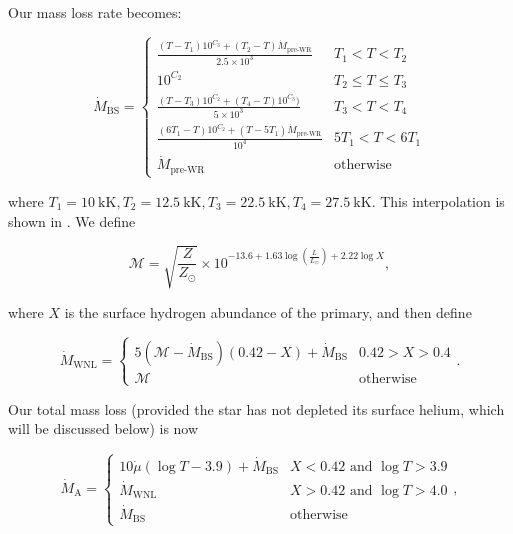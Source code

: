 Our mass loss rate becomes:

\begin{equation}
    \dot{M}_\text{BS} = \begin{cases}
        \frac{(T-T_1)10^{C_3}+(T_2-T)\dot{M}_\text{pre-WR}}{2.5\times 10^3} & T_1 < T < T_2 \\
        10^{C_2} & T_2 \leq T \leq T_3 \\
        \frac{(T-T_3)10^{C_2}+(T_4-T)10^{C_3})}{5 \times 10^3} & T_3 < T < T_4 \\
        \frac{(6T_1-T)10^{C_2}+(T-5T_1)\dot{M}_\text{pre-WR}}{10^4} & 5T_1 < T < 6T_1 \\
        \dot{M}_\text{pre-WR} & \text{otherwise}
    \end{cases}
\end{equation}

where $T_1=\SI{10}{\kilo\kelvin}, T_2=\SI{12.5}{\kilo\kelvin}, T_3=\SI{22.5}{\kilo\kelvin}, T_4=\SI{27.5}{\kilo\kelvin}$. This interpolation is shown in . We define

\begin{equation}
    \mathcal{M} = \sqrt{\frac{Z}{Z_\odot}}\times 10^{-13.6 + 1.63\log\left(\frac{L}{L_\odot}\right)+2.22\log X},
\end{equation}

where $X$ is the surface hydrogen abundance of the primary, and then define

\begin{equation}
    \dot{M}_\text{WNL} = \begin{cases}
        5\left(\mathcal{M}-\dot{M}_\text{BS}\right)\left(0.42-X\right)+\dot{M}_\text{BS} & 0.42 > X > 0.4 \\
        \mathcal{M} & \text{otherwise}
    \end{cases}.
\end{equation}

Our total mass loss (provided the star has not depleted its surface helium, which will be discussed below) is now

\begin{equation}
    \dot{M}_\text{A} = \begin{cases}
        10\dot{\mu}\left(\log T-3.9\right) + \dot{M}_\text{BS} & X < 0.42 \text{ and } \log T > 3.9 \\
        \dot{M}_\text{WNL} & X > 0.42 \text{ and } \log T > 4.0 \\
        \dot{M}_\text{BS} & \text{otherwise}
    \end{cases},
\end{equation}


